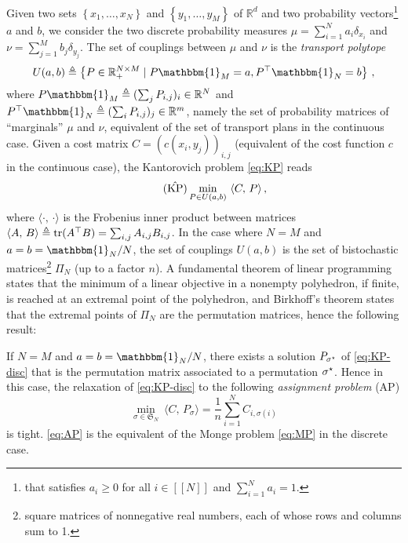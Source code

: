         Given two sets $\left\{ x_{1},\dots,x_N \right\}$ and $\left\{ y_{1},\dots,y_M \right\}$ of $\mathbb{R}^d$ and two probability vectors\footnote{that satisfies $a_{i}\geq 0$ for all $i\in[\![N]\!]$ and $\sum_{i=1}^Na_{i}=1$.} $a$ and $b$, we consider the two discrete probability measures $\mu=\sum_{i=1}^Na_{i}\delta_{x_{i}}$ and $\nu=\sum_{j=1}^Mb_{j}\delta_{y_{j}}$. The set of couplings between $\mu$ and $\nu$ is the \emph{transport polytope}
        $$U(a,b)\defeq \left\{ P\in\RR_+^{N\times M}\mid P\mathbbm{1}_M=a, P^\top\mathbbm{1}_N=b\right\}\,,$$
        where $P\mathbbm{1}_M\defeq( \sum_{j}P_{i,j})_{i}\in\mathbb{R}^N$ and $P^\top\mathbbm{1}_N\defeq( \sum_{i}P_{i,j})_{j}\in\mathbb{R}^m$,
        namely the set of probability matrices of ``marginals'' $\mu$ and $\nu$, equivalent of the set of transport plans in the continuous case. Given a cost matrix $C=(c(x_i,y_j))_{i,j}$ (equivalent of the cost function $c$ in the continuous case), the Kantorovich problem \cref{eq:KP} reads
        \begin{equation}
            \tag{$\hat{\text{KP}}$}
            \min_{P\in U(a,b)}\ \langle C,\,P\rangle\,,
            \label{eq:KP-disc}
        \end{equation}
        where $\langle \cdot,\,\cdot\rangle$ is the Frobenius inner product between matrices $\langle A,\,B\rangle\triangleq\operatorname{tr}(A^\top B)=\sum_{i,j} A_{i,j} B_{i,j}$. In the case where $N=M$ and $a=b=\mathbbm{1}_N/N$, the set of couplings $U(a,b)$ is the set of bistochastic matrices\footnote{square matrices of nonnegative real numbers, each of whose rows and columns sum to 1.} $\Pi_N$ (up to a factor $n$). A fundamental theorem of linear programming states that the minimum of a linear objective in a nonempty polyhedron, if finite, is reached at an extremal point of the polyhedron, and Birkhoff's theorem states that the extremal points of $\Pi_N$ are the permutation matrices, hence the following result:
        \begin{proposition}
            If $N=M$ and $a=b=\mathbbm{1}_N/N$, there exists a solution $P_{\sigma^\star}$ of \cref{eq:KP-disc} that is the permutation matrix associated to a permutation $\sigma^\star$.
            Hence in this case, the relaxation of \cref{eq:KP-disc} to the following \emph{assignment problem} (AP)
            \begin{equation}
                \tag{AP}
                \min_{\sigma \in \mathfrak{S}_N}\ \langle C,\,P_\sigma\rangle=\frac1n\sum_{i=1}^NC_{i,\sigma(i)}
                \label{eq:AP}
            \end{equation}
            is tight. \cref{eq:AP} is the equivalent of the Monge problem \cref{eq:MP} in the discrete case.
        \end{proposition}


